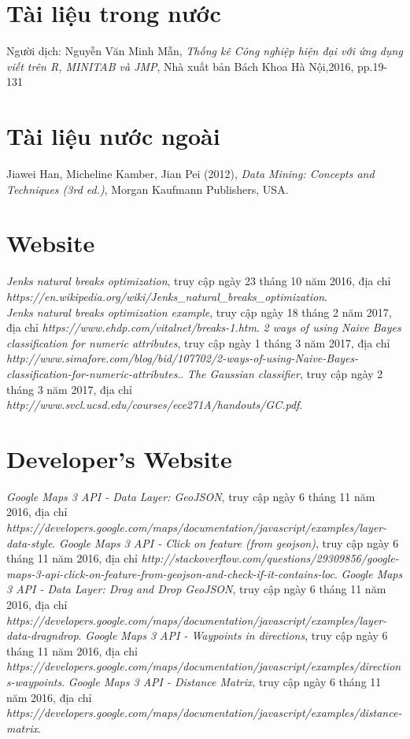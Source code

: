 \documentclass[a4paper, 13pt]{report}
\begin{document}
\cleardoublepage
{}
\begin{thebibliography}{9}
\section*{Tài liệu trong nước}
	Người dịch: Nguyễn Văn Minh Mẫn, 
	\emph{Thống kê Công nghiệp hiện đại với ứng dụng viết trên R, MINITAB và JMP},
	Nhà xuất bản Bách Khoa Hà Nội,2016, pp.19-131
\section*{Tài liệu nước ngoài}
	Jiawei Han, Micheline Kamber, Jian Pei (2012),
	\emph{Data Mining: Concepts and Techniques (3rd ed.)},
	Morgan Kaufmann Publishers, USA.
\section*{Website}
	\emph{Jenks natural breaks optimization}, truy cập ngày 23 tháng 10 năm 2016,
	địa chỉ \emph{https://en.wikipedia.org/wiki/Jenks\_natural\_breaks\_optimization}.\\
	\emph{Jenks natural breaks optimization example}, truy cập ngày 18 tháng 2 năm 2017,
	địa chỉ \emph{https://www.ehdp.com/vitalnet/breaks-1.htm}.
	\emph{2 ways of using Naive Bayes classification for numeric attributes}, truy cập ngày 1 tháng 3 năm 2017,
	địa chỉ \emph{http://www.simafore.com/blog/bid/107702/2-ways-of-using-Naive-Bayes-classification-for-numeric-attributes}..
	\emph{The Gaussian classifier}, truy cập ngày 2 tháng 3 năm 2017,
	địa chỉ \emph{http://www.svcl.ucsd.edu/courses/ece271A/handouts/GC.pdf}.
	
		
	
\section*{Developer's Website}
	\emph{Google Maps 3 API - Data Layer: GeoJSON}, truy cập ngày 6 tháng 11 năm 2016,
	địa chỉ \emph{https://developers.google.com/maps/documentation/javascript/examples/layer-data-style}.	
	\emph{Google Maps 3 API - Click on feature (from geojson)}, truy cập ngày 6 tháng 11 năm 2016,
	địa chỉ \emph{http://stackoverflow.com/questions/29309856/google-maps-3-api-click-on-feature-from-geojson-and-check-if-it-contains-loc}.
	\emph{Google Maps 3 API - Data Layer: Drag and Drop GeoJSON}, truy cập ngày 6 tháng 11 năm 2016,
	địa chỉ \emph{https://developers.google.com/maps/documentation/javascript/examples/layer-data-dragndrop}.		
	\emph{Google Maps 3 API - Waypoints in directions}, truy cập ngày 6 tháng 11 năm 2016,
	địa chỉ \emph{https://developers.google.com/maps/documentation/javascript/examples/directions-waypoints}.	
	\emph{Google Maps 3 API - Distance Matrix}, truy cập ngày 6 tháng 11 năm 2016,
	địa chỉ \emph{https://developers.google.com/maps/documentation/javascript/examples/distance-matrix}.	
\end{thebibliography}
\pagebreak
\end{document}
